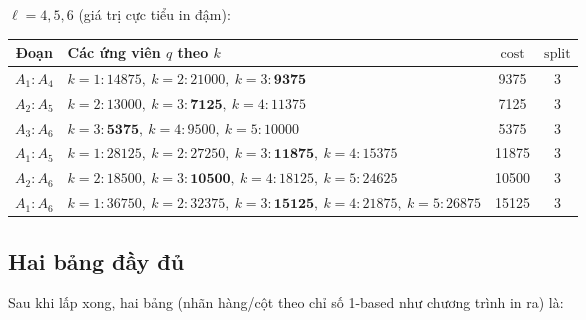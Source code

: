 \documentclass[12pt,a4paper]{article}
\begin{document}
\textbf{$\ell = 4, 5, 6$} (giá trị cực tiểu in đậm):

\begin{table}[H]
\centering\small
\begin{tabular}{c l c c}
\toprule
Đoạn & Các ứng viên $q$ theo $k$ & $\mathrm{cost}$ & $\mathrm{split}$ \\
\midrule
$A_1{:}A_4$ & $k{=}1{:}14875,\ k{=}2{:}21000,\ k{=}3{:}\mathbf{9375}$ & 9375 & 3 \\
$A_2{:}A_5$ & $k{=}2{:}13000,\ k{=}3{:}\mathbf{7125},\ k{=}4{:}11375$ & 7125 & 3 \\
$A_3{:}A_6$ & $k{=}3{:}\mathbf{5375},\ k{=}4{:}9500,\ k{=}5{:}10000$ & 5375 & 3 \\
\midrule
$A_1{:}A_5$ & $k{=}1{:}28125,\ k{=}2{:}27250,\ k{=}3{:}\mathbf{11875},\ k{=}4{:}15375$ & 11875 & 3 \\
$A_2{:}A_6$ & $k{=}2{:}18500,\ k{=}3{:}\mathbf{10500},\ k{=}4{:}18125,\ k{=}5{:}24625$ & 10500 & 3 \\
\midrule
$A_1{:}A_6$ & $k{=}1{:}36750,\ k{=}2{:}32375,\ k{=}3{:}\mathbf{15125},\ k{=}4{:}21875,\ k{=}5{:}26875$ & 15125 & 3 \\
\bottomrule
\end{tabular}
\end{table}

\subsection{Hai bảng đầy đủ}
Sau khi lấp xong, hai bảng (nhãn hàng/cột theo chỉ số 1-based như chương trình in ra) là:
\end{document}
